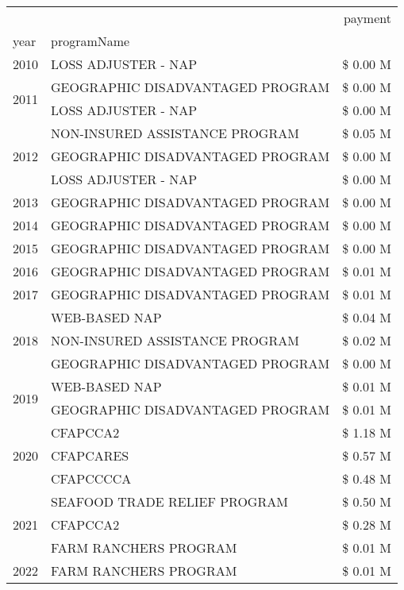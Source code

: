 \begin{tabular}{llr}
\toprule
 &  & payment \\
year & programName &  \\
\midrule
2010 & LOSS ADJUSTER - NAP & \$ 0.00 M \\
\cline{1-3}
\multirow[t]{2}{*}{2011} & GEOGRAPHIC DISADVANTAGED PROGRAM & \$ 0.00 M \\
 & LOSS ADJUSTER - NAP & \$ 0.00 M \\
\cline{1-3}
\multirow[t]{3}{*}{2012} & NON-INSURED ASSISTANCE PROGRAM & \$ 0.05 M \\
 & GEOGRAPHIC DISADVANTAGED PROGRAM & \$ 0.00 M \\
 & LOSS ADJUSTER - NAP & \$ 0.00 M \\
\cline{1-3}
2013 & GEOGRAPHIC DISADVANTAGED PROGRAM & \$ 0.00 M \\
\cline{1-3}
2014 & GEOGRAPHIC DISADVANTAGED PROGRAM & \$ 0.00 M \\
\cline{1-3}
2015 & GEOGRAPHIC DISADVANTAGED PROGRAM & \$ 0.00 M \\
\cline{1-3}
2016 & GEOGRAPHIC DISADVANTAGED PROGRAM & \$ 0.01 M \\
\cline{1-3}
2017 & GEOGRAPHIC DISADVANTAGED PROGRAM & \$ 0.01 M \\
\cline{1-3}
\multirow[t]{3}{*}{2018} & WEB-BASED NAP & \$ 0.04 M \\
 & NON-INSURED ASSISTANCE PROGRAM & \$ 0.02 M \\
 & GEOGRAPHIC DISADVANTAGED PROGRAM & \$ 0.00 M \\
\cline{1-3}
\multirow[t]{2}{*}{2019} & WEB-BASED NAP & \$ 0.01 M \\
 & GEOGRAPHIC DISADVANTAGED PROGRAM & \$ 0.01 M \\
\cline{1-3}
\multirow[t]{3}{*}{2020} & CFAPCCA2 & \$ 1.18 M \\
 & CFAPCARES & \$ 0.57 M \\
 & CFAPCCCCA & \$ 0.48 M \\
\cline{1-3}
\multirow[t]{3}{*}{2021} & SEAFOOD TRADE RELIEF PROGRAM & \$ 0.50 M \\
 & CFAPCCA2 & \$ 0.28 M \\
 & FARM RANCHERS PROGRAM & \$ 0.01 M \\
\cline{1-3}
2022 & FARM RANCHERS PROGRAM & \$ 0.01 M \\
\cline{1-3}
\bottomrule
\end{tabular}
